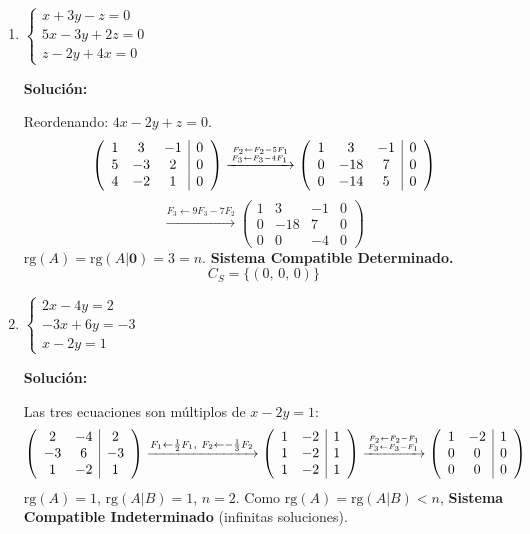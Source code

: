 \documentclass[12pt]{article}
\newcommand{\solucion}{%
    \vspace{0.8em}%
    \textbf{Solución:}%
}
\begin{document}
\begin{enumerate}[label=\alph*.-]
    \item $\begin{cases} x + 3y - z = 0 \\ 5x - 3y + 2z = 0 \\ z - 2y + 4x = 0 \end{cases}$

    \solucion

    Reordenando: $4x - 2y + z = 0$.
    \[
    \left(\begin{array}{ccc|c}1&3&-1&0\\5&-3&2&0\\4&-2&1&0\end{array}\right)
    \xrightarrow{F_2 \leftarrow F_2 - 5F_1 \atop F_3 \leftarrow F_3 - 4F_1}
    \left(\begin{array}{ccc|c}1&3&-1&0\\0&-18&7&0\\0&-14&5&0\end{array}\right)
    \]
    \[
    \xrightarrow{F_3 \leftarrow 9F_3 - 7F_2}
    \left(\begin{array}{ccc|c}1&3&-1&0\\0&-18&7&0\\0&0&-4&0\end{array}\right)
    \]
    $\text{rg}(A) = \text{rg}(A|\mathbf{0}) = 3 = n$. \textbf{Sistema Compatible Determinado.}
    \[C_S = \{(0,\,0,\,0)\}\]

    \item $\begin{cases} 2x - 4y = 2 \\ -3x + 6y = -3 \\ x - 2y = 1 \end{cases}$

    \solucion

    Las tres ecuaciones son múltiplos de $x - 2y = 1$:
    \[
    \left(\begin{array}{cc|c}2&-4&2\\-3&6&-3\\1&-2&1\end{array}\right)
    \xrightarrow{F_1 \leftarrow \frac{1}{2}F_1,\ F_2 \leftarrow -\frac{1}{3}F_2}
    \left(\begin{array}{cc|c}1&-2&1\\1&-2&1\\1&-2&1\end{array}\right)
    \xrightarrow{F_2 \leftarrow F_2-F_1 \atop F_3 \leftarrow F_3-F_1}
    \left(\begin{array}{cc|c}1&-2&1\\0&0&0\\0&0&0\end{array}\right)
    \]
    $\text{rg}(A)=1$, $\text{rg}(A|B)=1$, $n=2$. Como $\text{rg}(A)=\text{rg}(A|B)<n$,
    \textbf{Sistema Compatible Indeterminado} (infinitas soluciones).


\end{enumerate}
\end{document}
